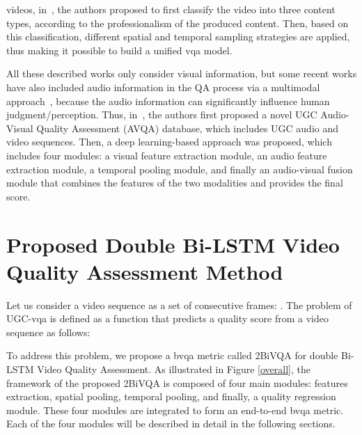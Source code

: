 \documentclass[journal]{IEEEtran}
\begin{document}
videos, in~\cite{huang2023xgc}, the authors proposed to first classify the video into three content types, according to the professionalism of the produced content. Then, based on this classification, different spatial and temporal sampling strategies are applied, thus making it possible  to build a unified \ac{vqa} model.


All these described works only consider visual information, but some recent works have also included audio information in the QA process via a multimodal approach~\cite{min2020study,cao2023subjective}, because the audio information can significantly influence human judgment/perception. Thus, in~\cite{cao2023subjective}, the authors first proposed a novel UGC Audio-Visual Quality Assessment (AVQA) database, which includes UGC audio and video sequences. Then, a deep learning-based approach was proposed, which includes 
 four modules: a visual feature extraction module, an audio feature
extraction module, a temporal pooling module, and finally an audio-visual fusion module that combines the features of the two modalities and provides the final score.






\section{Proposed Double Bi-LSTM Video Quality Assessment Method}
\label{proposed}
Let us consider a video sequence  as a set of  consecutive frames: . The problem of UGC-\ac{vqa} is defined as a function  that predicts a quality score  from a video sequence  as follows:  


To address this problem, we propose a \ac{bvqa} metric called 2BiVQA for double Bi-LSTM Video Quality Assessment. As illustrated in Figure \ref{overall}, the framework of the proposed 2BiVQA is composed of four main modules: features extraction, spatial pooling, temporal pooling, and finally, a quality regression module. These four modules are integrated to form an end-to-end \ac{bvqa} metric. Each of the four modules will be described in detail in the following sections. 
\end{document}
